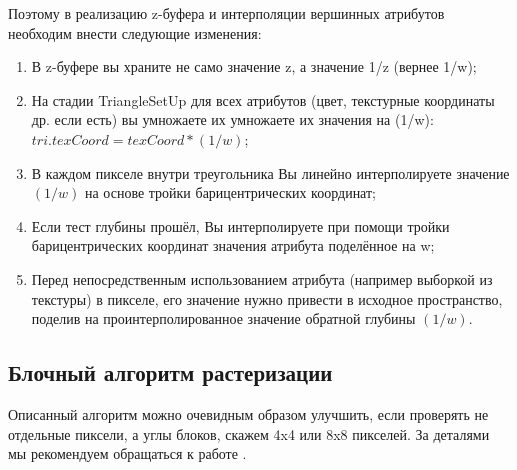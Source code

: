 \documentclass[12pt,subf,href,colorlinks=true]{article}
\begin{document}
Поэтому в реализацию z-буфера и интерполяции вершинных атрибутов необходим внести следующие изменения:

\begin{enumerate}
\item В z-буфере вы храните не само значение z, а значение 1/z (вернее 1/w);
\item На стадии TriangleSetUp для всех атрибутов (цвет, текстурные координаты др. если есть) вы умножаете их умножаете их значения на (1/w): \newline $tri.texCoord = texCoord*(1/w)$;
\item В каждом пикселе внутри треугольника Вы линейно интерполируете значение $(1/w)$ на основе тройки барицентрических координат;
\item Если тест глубины прошёл, Вы интерполируете при помощи тройки барицентрических координат значения атрибута поделённое на w;
\item Перед непосредственным использованием атрибута (например выборкой из текстуры) в пикселе, его значение нужно привести в исходное пространство, поделив на проинтерполированное значение обратной глубины $(1/w)$.
\end{enumerate}

\subsection{Блочный алгоритм растеризации}

Описанный алгоритм можно очевидным образом улучшить, если проверять не отдельные пиксели, а углы блоков, скажем 4x4 или 8x8 пикселей. За деталями мы рекомендуем обращаться к работе \cite{Mileff2015AcceleratedHT}. 
\end{document}
